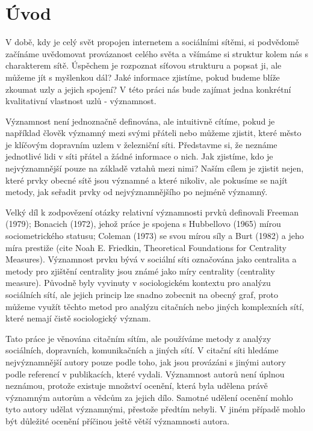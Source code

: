 \documentclass{bakalarka}
\begin{document}

\clearpage
\pagestyle{empty}
\setlength{\cftbeforetoctitleskip}{-2em}
\tableofcontents

\clearpage
\setcounter{page}{1}
\pagestyle{fancy}
\chapter{Úvod}
V době, kdy je celý svět propojen internetem a sociálními sítěmi, si podvědomě
začínáme uvědomovat provázanost celého světa a všímáme si struktur kolem nás s
charakterem sítě. Úspěchem je rozpoznat síťovou strukturu a popsat ji, ale
můžeme jít s myšlenkou dál? Jaké informace zjistíme, pokud budeme blíže zkoumat
uzly a jejich spojení? V této práci nás bude zajímat jedna konkrétní
kvalitativní vlastnost uzlů - významnost.

Významnost není jednoznačně definována, ale intuitivně cítíme, pokud je
například člověk významný mezi svými přáteli nebo můžeme zjistit, které město
je klíčovým dopravním uzlem v železniční síti.  Představme si, že neznáme
jednotlivé lidi v síti přátel a žádné informace o nich. Jak zjistíme, kdo je
nejvýznamnější pouze na základě vztahů mezi nimi? Naším cílem je zjistit nejen,
které prvky obecné sítě jsou významné a které nikoliv, ale pokusíme se najít
metody, jak seřadit prvky od nejvýznamnějšího po nejméně významný.

Velký díl k zodpovězení otázky relativní významnosti prvků definovali Freeman
(1979); Bonacich (1972), jehož práce je spojena s Hubbellovo (1965) mírou
sociometrického statusu; Coleman (1973) se svou mírou síly a Burt (1982) a jeho
míra prestiže (cite Noah E. Friedkin, Theoretical Foundations for Centrality
Measures). Významnost prvku bývá v sociální síti označována jako centralita a
metody pro zjištění centrality jsou známé jako míry centrality (centrality
measure). Původně byly vyvinuty v sociologickém kontextu pro analýzu sociálních
sítí, ale jejich princip lze snadno zobecnit na obecný graf, proto můžeme
využít těchto metod pro analýzu citačních nebo jiných komplexních sítí, které
nemají čistě sociologický význam.

Tato práce je věnována citačním sítím, ale používáme metody z analýzy
sociálních, dopravních, komunikačních a jiných sítí. V citační síti hledáme
nejvýznamnější autory pouze podle toho, jak jsou provázáni s jinými autory
podle referencí v publikacích, které vydali. Významnost autorů není úplnou
neznámou, protože existuje množství ocenění, která byla udělena právě významným
autorům a vědcům za jejich dílo. Samotné udělení ocenění mohlo tyto autory
udělat významnými, přestože předtím nebyli. V jiném případě mohlo být důležité
ocenění příčinou ještě větší významnosti autora. 
\end{document}
